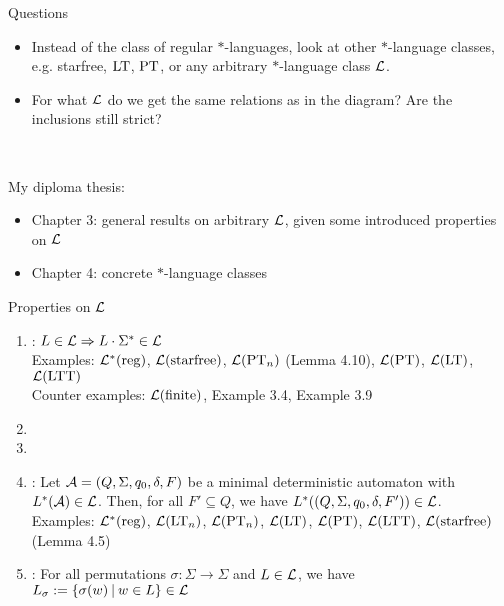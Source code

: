 \documentclass[
	notheorems,noamsthm]{beamer}
\begin{document}
\begin{frame}[<+->]{Questions}
\begin{itemize}
\item Instead of the class of regular $*$-languages, look at other $*$-language classes, e.g. starfree, $\textup{\textrm{LT}}$, $\textup{\textrm{PT}}$, or any arbitrary $*$-language class $\mathcal{L}$.
\item For what $\mathcal{L}$ do we get the same relations as in the diagram? Are the inclusions still strict?
\end{itemize}
\

My diploma thesis:
\begin{itemize}
\item Chapter 3: general results on arbitrary $\mathcal{L}$, given some introduced properties on $\mathcal{L}$
\item Chapter 4: concrete $*$-language classes
\end{itemize}
\end{frame}

\begin{frame}[<+->]{Properties on $\mathcal{L}$}
\begin{enumerate}
\item {}: $L \in \mathcal{L} \Rightarrow L \cdot \Sigma^* \in \mathcal{L}$ \\
Examples: $\mathcal{L}^*(\textup{\textrm{reg}})$, $\mathcal{L}(\textup{\textrm{starfree}})$, $\mathcal{L}(\textup{\textrm{PT}}_n)$ (Lemma 4.10), $\mathcal{L}(\textup{\textrm{PT}})$, $\mathcal{L}(\textup{\textrm{LT}})$, $\mathcal{L}(\textup{\textrm{LTT}})$ \\
Counter examples: $\mathcal{L}(\textup{\textrm{finite}})$, Example 3.4, Example 3.9
\item {}
\item {}
\item {}:
Let $\mathcal{A} = (Q,\Sigma,q_0,\delta,F)$ be a minimal deterministic automaton with $L^*(\mathcal{A}) \in \mathcal{L}$. Then, for all $F' \subseteq Q$, we have $L^*((Q,\Sigma,q_0,\delta,F')) \in \mathcal{L}$. \\
Examples: $\mathcal{L}^*(\textup{\textrm{reg}})$, $\mathcal{L}(\textup{\textrm{LT}}_n)$, $\mathcal{L}(\textup{\textrm{PT}}_n)$, $\mathcal{L}(\textup{\textrm{LT}})$, $\mathcal{L}(\textup{\textrm{PT}})$, $\mathcal{L}(\textup{\textrm{LTT}})$, $\mathcal{L}(\textup{\textrm{starfree}})$ (Lemma 4.5)
\item {}: For all permutations $\sigma \colon \Sigma \rightarrow \Sigma$ and $L \in \mathcal{L}$, we have $L_\sigma := \Set{\sigma(w)}{w \in L} \in \Lang$
\end{enumerate}
\end{frame}
\end{document}
